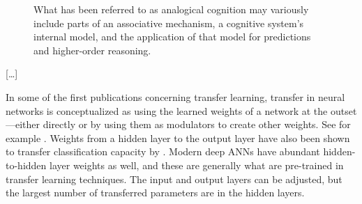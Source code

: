 \documentclass[11pt, oneside]{article}   	%
\begin{document}
\begin{figure}
\begin{center}
\caption{What has been referred to as analogical cognition may variously include parts of an associative mechanism, a cognitive system's internal model, and the application of that model for predictions and higher-order reasoning.  }

\end{center}
\end{figure}


[\dots]


In some of the first publications concerning transfer learning, transfer in neural networks is conceptualized as using the learned weights of a network at the outset---either directly or by using them as modulators to create other weights.  See for example \citet{Pratt1991,Pratt1993}.  Weights from a hidden layer to the output layer have also been shown to transfer classification capacity by \citet[p. 322]{Sharkeyetal1993}.  Modern deep ANNs have abundant hidden-to-hidden layer weights as well, and these are generally what are pre-trained in transfer learning techniques.  The input and output layers can be adjusted, but the largest number of transferred parameters are in the hidden layers.

\end{document}
